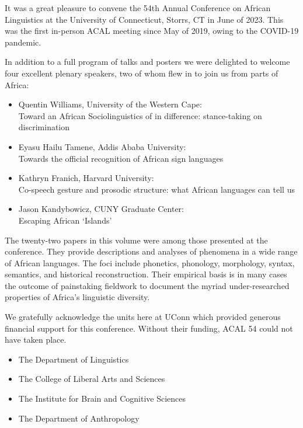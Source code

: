 
It was a great pleasure to convene the 54th Annual Conference on African Linguistics at the University of Connecticut, Storrs, CT in June of 2023. This was the first in-person ACAL meeting since May of 2019, owing to the COVID-19 pandemic.

In addition to a full program of talks and posters we were delighted to welcome four excellent plenary speakers, two of whom flew in to join us from parts of Africa:

\begin{itemize}

\item Quentin Williams, University of the Western Cape: \\
Toward an {A}frican {S}ociolinguistics of in difference: stance-taking on discrimination


\item Eyasu Hailu Tamene, Addis Ababa University: \\ Towards the official recognition of African sign languages

\item Kathryn Franich, Harvard University: \\ Co-speech gesture and prosodic structure: what African languages can tell us

\item Jason Kandybowicz, CUNY Graduate Center: \\ 
Escaping African `Islands'

\end{itemize}

The twenty-two papers in this volume were among those presented at the conference. They provide descriptions and analyses of phenomena in a wide range of African languages. The foci include phonetics, phonology, morphology, syntax, semantics, and historical reconstruction. Their empirical basis is in many cases the outcome of painstaking fieldwork to document the myriad under-researched properties of Africa’s linguistic diversity.

We gratefully acknowledge the units here at UConn which provided generous financial support for this conference. Without their funding, ACAL 54 could not have taken place.
\largerpage
\begin{itemize}

\item The Department of Linguistics
\item The College of Liberal Arts and Sciences
\item The Institute for Brain and Cognitive Sciences
\item The Department of Anthropology

\end{itemize}

